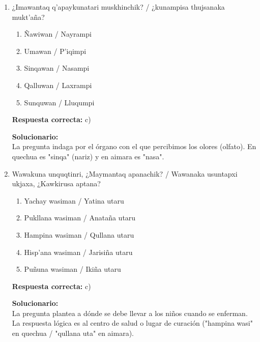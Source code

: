 \begin{enumerate}
	
	\item ¿Imawantaq q'apaykunatari muskhinchik? / ¿kunampisa thujsanaka mukt'aña?
	\begin{enumerate}[label=\alph*)]
		\item Ñawiwan / Nayrampi
		\item Umawan / P'iqimpi
		\item Sinqawan / Nasampi
		\item Qalluwan / Laxrampi
		\item Sunquwan / Lluqumpi
	\end{enumerate}
	\textbf{Respuesta correcta:} c)
	
	\vspace{2mm}
	\textbf{Solucionario:}\\
	La pregunta indaga por el órgano con el que percibimos los olores (olfato). En quechua es "sinqa" (nariz) y en aimara es "nasa".
	
	\vspace{6mm}
	
	\item Wawakuna unquqtinri, ¿Maymantaq apanachik? / Wawanaka usuntapxi ukjaxa, ¿Kawkirusa aptana?
	\begin{enumerate}[label=\alph*)]
		\item Yachay wasiman / Yatina utaru
		\item Pukllana wasiman / Anataña utaru
		\item Hampina wasiman / Qullana utaru
		\item Hisp'ana wasiman / Jarisiña utaru
		\item Puñuna wasiman / Ikiña utaru
	\end{enumerate}
	\textbf{Respuesta correcta:} c)
	
	\vspace{2mm}
	\textbf{Solucionario:}\\
	La pregunta plantea a dónde se debe llevar a los niños cuando se enferman. La respuesta lógica es al centro de salud o lugar de curación ("hampina wasi" en quechua / "qullana uta" en aimara).
	
	\vspace{6mm}
	
\end{enumerate}














